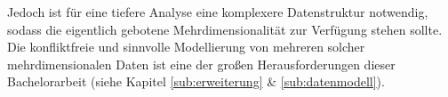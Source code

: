 Jedoch ist für eine tiefere Analyse eine komplexere Datenstruktur notwendig, sodass die eigentlich gebotene Mehrdimensionalität zur Verfügung stehen sollte. 
Die konfliktfreie und sinnvolle Modellierung von mehreren solcher mehrdimensionalen Daten ist eine der großen Herausforderungen dieser Bachelorarbeit (siehe Kapitel \ref{sub:erweiterung} \& \ref{sub:datenmodell}).